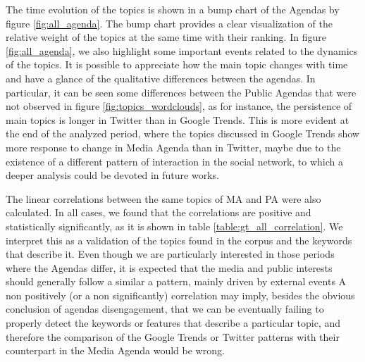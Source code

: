 \documentclass{bmcart}
\begin{document}
\par The time evolution of the topics is shown in a bump chart of the Agendas by figure \ref{fig:all_agenda}. The bump chart provides  a clear visualization of the relative weight of the topics at the same time with their ranking. In figure \ref{fig:all_agenda}, we also highlight some important events related to the dynamics of the topics.
It is possible to appreciate how the main topic changes with time and have a glance of the qualitative differences between the agendas. In particular, it can be seen some differences between the Public Agendas that were not observed in figure \ref{fig:topics_wordclouds}, as for instance, the persistence of main topics is longer in Twitter than in Google Trends. This is more evident at the end of the analyzed period, where the topics discussed in Google Trends show more response to change in Media Agenda than in Twitter, maybe due to the existence of a different pattern of interaction in the social network, to which a deeper analysis could be devoted in future works.
\par The linear correlations between the same topics of MA and PA were also calculated. In all cases, we found that the correlations are positive and statistically significantly, as it is shown in table \ref{table:gt_all_correlation}.  
We interpret this as a validation of the topics found in the corpus and the keywords that describe it. Even though we are particularly interested in those periods where the Agendas differ, it is expected that the media and public interests should generally follow a similar a pattern, mainly driven by external events
A non positively (or a non significantly) correlation may imply, besides the obvious conclusion of agendas disengagement, that we can be eventually failing to properly detect the keywords or features that describe a particular topic, and therefore the comparison of the Google Trends or Twitter patterns with their counterpart in the Media Agenda would be wrong.

\end{document}
